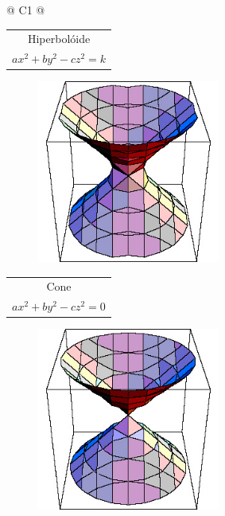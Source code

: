 \begin{longtable}{
		@{}
		C{1\textwidth} 
		@{}}
\begin{tabular}[c]{@{}c@{}}
				{\large Hiperbolóide} \\

				{\large $ax^{2} + by^{2} - cz^{2} = k$} \\

            \end{tabular}

			\begin{figure}[H]
			    \centering	\includegraphics[height=6cm]{images/ufmg_figura-1-4}
			\end{figure}
			\tabularnewline
			\midrule
			\begin{tabular}[c]{@{}c@{}} 

				{\large Cone} \\

				{\large $ax^{2} + by^{2} - cz^{2} = 0$} \\

            \end{tabular}

			\begin{figure}[H]
			    \centering	\includegraphics[height=6cm]{images/ufmg_figura-1-5}
			\end{figure}
			\tabularnewline
			\midrule
			\begin{tabular}[c]{@{}c@{}} 


\end{tabular}
\end{longtable}
